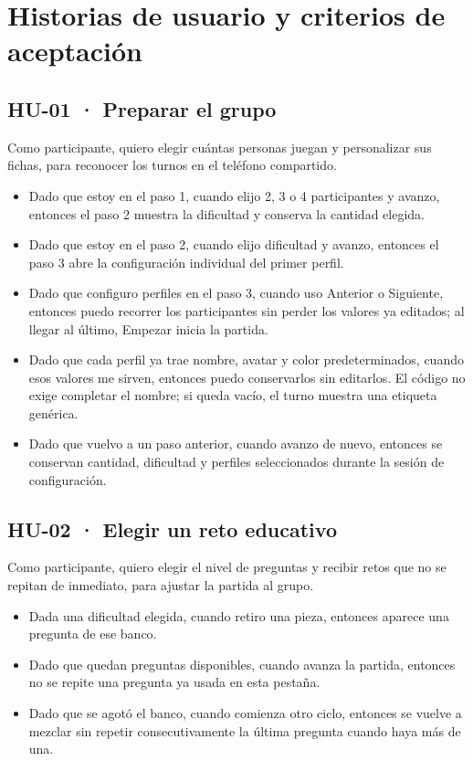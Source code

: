 \documentclass[11pt,letterpaper]{article}
\begin{document}
\section{Historias de usuario y criterios de aceptación}

\subsection*{HU-01 · Preparar el grupo}
Como participante, quiero elegir cuántas personas juegan y personalizar sus fichas, para reconocer los turnos en el teléfono compartido.
\begin{itemize}
  \item Dado que estoy en el paso 1, cuando elijo 2, 3 o 4 participantes y avanzo, entonces el paso 2 muestra la dificultad y conserva la cantidad elegida.
  \item Dado que estoy en el paso 2, cuando elijo dificultad y avanzo, entonces el paso 3 abre la configuración individual del primer perfil.
  \item Dado que configuro perfiles en el paso 3, cuando uso Anterior o Siguiente, entonces puedo recorrer los participantes sin perder los valores ya editados; al llegar al último, Empezar inicia la partida.
  \item Dado que cada perfil ya trae nombre, avatar y color predeterminados, cuando esos valores me sirven, entonces puedo conservarlos sin editarlos. El código no exige completar el nombre; si queda vacío, el turno muestra una etiqueta genérica.
  \item Dado que vuelvo a un paso anterior, cuando avanzo de nuevo, entonces se conservan cantidad, dificultad y perfiles seleccionados durante la sesión de configuración.
\end{itemize}

\subsection*{HU-02 · Elegir un reto educativo}
Como participante, quiero elegir el nivel de preguntas y recibir retos que no se repitan de inmediato, para ajustar la partida al grupo.
\begin{itemize}
  \item Dada una dificultad elegida, cuando retiro una pieza, entonces aparece una pregunta de ese banco.
  \item Dado que quedan preguntas disponibles, cuando avanza la partida, entonces no se repite una pregunta ya usada en esta pestaña.
  \item Dado que se agotó el banco, cuando comienza otro ciclo, entonces se vuelve a mezclar sin repetir consecutivamente la última pregunta cuando haya más de una.
\end{itemize}
\end{document}
